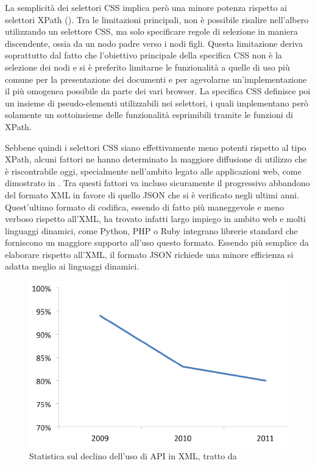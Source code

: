 La semplicità dei selettori CSS implica però una minore potenza rispetto ai selettori XPath (\cite{resigXpathCss}). Tra le limitazioni principali, non è possibile risalire nell'albero utilizzando un selettore CSS, ma solo specificare regole di selezione in maniera discendente, ossia da un nodo padre verso i nodi figli. Questa limitazione deriva soprattutto dal fatto che l'obiettivo principale della specifica CSS non è la selezione dei nodi e si è preferito limitarne le funzionalità a quelle di uso più comune per la presentazione dei documenti e per agevolarne un'implementazione il più omogenea possibile da parte dei vari browser. La specifica CSS definisce poi un insieme di pseudo-elementi utilizzabili nei selettori, i quali implementano però solamente un sottoinsieme delle funzionalità esprimibili tramite le funzioni di XPath.

Sebbene quindi i selettori CSS siano effettivamente meno potenti rispetto al tipo XPath, alcuni fattori ne hanno determinato la maggiore diffusione di utilizzo che è riscontrabile oggi, specialmente nell'ambito legato alle applicazioni web, come dimostrato in \cite{byeXml}.
Tra questi fattori va incluso sicuramente il progressivo abbandono del formato XML in favore di quello JSON che si è verificato negli ultimi anni. Quest'ultimo formato di codifica, essendo di fatto più maneggevole e meno verboso rispetto all'XML, ha trovato infatti largo impiego in ambito web e molti linguaggi dinamici, come Python, PHP o Ruby integrano librerie standard che forniscono un maggiore supporto all'uso questo formato. Essendo più semplice da elaborare rispetto all'XML, il formato JSON richiede una minore efficienza si adatta meglio ai linguaggi dinamici. 

\begin{figure}[htbp]
\begin{center}
\includegraphics[width=\textwidth]{images/byexml.png}
\caption{Statistica sul declino dell'uso di API in XML, tratto da \cite{byeXml}}
\label{default}
\end{center}
\end{figure}

